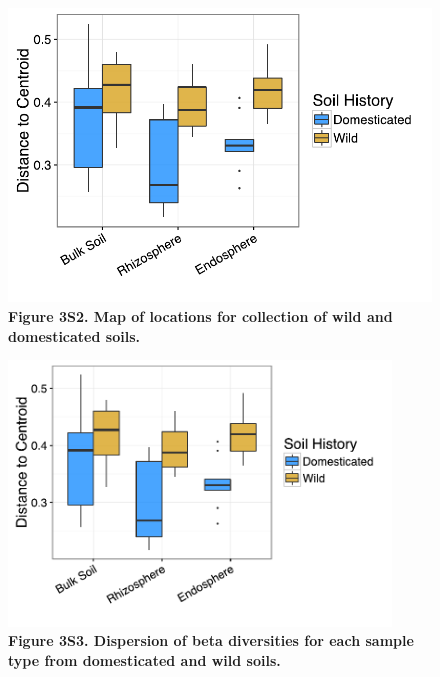\begin{figure}[h]
\centering
\includegraphics[width=6in]{Figures/figure2_s2}
\captionsetup{labelformat=empty}
\caption[Figure 3S2]{\textbf{Figure 3S2. Map of locations for collection of wild and domesticated soils.}}
\label{Figure 3S2}
\end{figure}

\newpage

\begin{figure}[h]
\centering
\includegraphics[width=4in]{Figures/figure2_s3}
\captionsetup{labelformat=empty}
\caption[Figure 3S3]{\textbf{Figure 3S3. Dispersion of beta diversities for each sample type from domesticated and wild soils.}}
\label{Figure 3S3}
\end{figure}